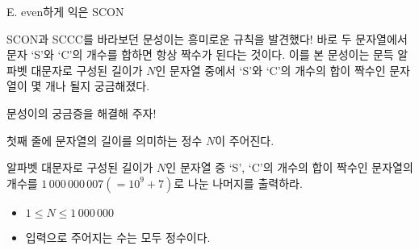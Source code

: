 \def\probtitle{even하게 익은 SCON}
\def\probno{E} %

\begin{problem}{\probno{}. \probtitle{}}

SCON과 SCCC를 바라보던 문성이는 흥미로운 규칙을 발견했다! 바로 두 문자열에서 문자 `S'와 `C'의 개수를 합하면 항상 짝수가 된다는 것이다. 이를 본 문성이는 문득 알파벳 대문자로 구성된 길이가 $N$인 문자열 중에서 `S'와 `C'의 개수의 합이 짝수인 문자열이 몇 개나 될지 궁금해졌다.

문성이의 궁금증을 해결해 주자!

\InputFile

첫째 줄에 문자열의 길이를 의미하는 정수 $N$이 주어진다.

\OutputFile

알파벳 대문자로 구성된 길이가 $N$인 문자열 중 `S', `C'의 개수의 합이 짝수인 문자열의 개수를 $1\,000\,000\,007(=10^9+7)$로 나눈 나머지를 출력하라.

\Constraints

\begin{itemize}[topsep=0pt,noitemsep]
    \item $1 \le N \le 1\,000\,000$
    \item 입력으로 주어지는 수는 모두 정수이다.
\end{itemize}

\Example

\begin{example}
\end{example}

\end{problem}